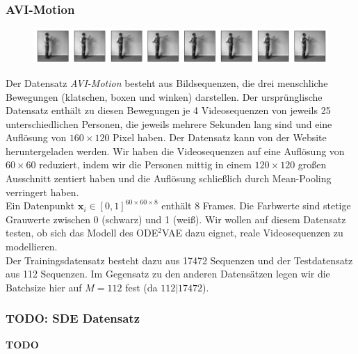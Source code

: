 \documentclass[12pt]{article}
\newcommand{\x}{\mathbf{x}_i}
\begin{document}
	\subsubsection{AVI-Motion}
	\begin{figure}[!htbp]
		\centering
		\includegraphics[scale=0.5]{AVIMotion}
	\end{figure}
	Der Datensatz \emph{AVI-Motion} besteht aus Bildsequenzen, die drei menschliche Bewegungen (klatschen, boxen und winken) darstellen. Der ursprünglische Datensatz enthält zu diesen Bewegungen je 4 Videosequenzen von jeweils 25 unterschiedlichen Personen, die jeweils mehrere Sekunden lang sind und eine Auflösung von $160\times120$ Pixel haben. Der Datensatz kann von der Website \cite{Dataset} heruntergeladen werden.
	Wir haben die Videosequenzen auf eine Auflösung von $60\times60$ reduziert, indem wir die Personen mittig in einem $120\times120$ großen Ausschnitt zentiert haben und die Auflösung schließlich durch Mean-Pooling verringert haben. \\
	Ein Datenpunkt $\x\in [0,1]^{60\times 60\times 8}$ enthält 8 Frames. Die Farbwerte sind stetige Grauwerte zwischen 0 (schwarz) und 1 (weiß). Wir wollen auf diesem Datensatz testen, ob sich das Modell des ODE$^2$VAE dazu eignet, reale Videosequenzen zu modellieren.\\
	Der Trainingsdatensatz besteht dazu aus 17472 Sequenzen und der Testdatensatz aus 112 Sequenzen. Im Gegensatz zu den anderen Datensätzen legen wir die Batchsize hier auf $M=112$ fest (da $112 | 17472$).

	\subsubsection{TODO: SDE Datensatz}
	\textbf{TODO}
	\newpage
\end{document}

